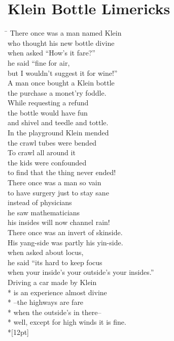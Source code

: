 \documentclass[times,12pt]{book}
\begin{document}
\section*{Klein Bottle Limericks}
\begin{tabbing}
\quad\=\kill
There once was a man named Klein\\
who thought his new bottle divine\\
\>when asked ``How's it fare?''\\
\>he said ``fine for air,\\
but I wouldn't suggest it for wine!''\\[12pt]

A man once bought a Klein bottle\\
the purchase a monet'ry foddle.\\
\>While requesting a refund\\
\>the bottle would have fun\\
and shivel and teedle and tottle.\\[12pt]

In the playground Klein mended\\
the crawl tubes were bended\\
\>To crawl all around it\\
\>the kids were confounded\\
to find that the thing never ended!\\[12pt]

There once was a man so vain\\
to have surgery just to stay sane\\
\>instead of physicians\\
\>he saw mathematicians\\
his insides will now channel rain!\\[12pt]

There once was an invert of skinside.\\
His yang-side was partly his yin-side.\\
\>when asked about locus,\\
\>he said ``its hard to keep focus\\
when your inside's your outside's your insides.''\\[12pt]

Driving a car made by Klein\\*
is an experience almost divine\\*
\>--the highways are fare\\*
\>when the outside's in there--\\*
well, except for high winds it is fine.\\*[12pt]
\end{tabbing}
\newpage
\end{document}
